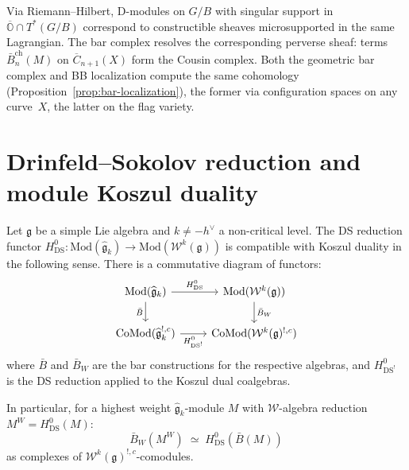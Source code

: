 \begin{remark}
\label{rem:microlocal-viewpoint}
Via Riemann--Hilbert, D-modules on $G/B$ with singular support in $\overline{\mathbb{O}} \cap T^*(G/B)$ correspond to constructible sheaves microsupported in the same Lagrangian.  The bar complex resolves the corresponding perverse sheaf: terms $\bar{B}_n^{\mathrm{ch}}(M)$ on $\overline{C}_{n+1}(X)$ form the Cousin complex.  Both the geometric bar complex and BB localization compute the same cohomology (Proposition~\ref{prop:bar-localization}), the former via configuration spaces on any curve~$X$, the latter on the flag variety.
\end{remark}

\section{Drinfeld--Sokolov reduction and module Koszul duality}
\label{sec:ds-module-kd}

\begin{theorem}
\label{thm:ds-koszul-intertwine}
Let $\mathfrak{g}$ be a simple Lie algebra and $k \neq -h^\vee$
a non-critical level.  The DS reduction functor
$H^0_{\mathrm{DS}}\colon
\mathrm{Mod}(\widehat{\mathfrak{g}}_k) \to
\mathrm{Mod}(\mathcal{W}^k(\mathfrak{g}))$
is compatible with Koszul duality in the following sense.
There is a commutative diagram of functors:
\begin{equation}\label{eq:ds-kd-square}
\begin{tikzcd}
\mathrm{Mod}(\widehat{\mathfrak{g}}_k) \ar[r, "H^0_{\mathrm{DS}}"]
  \ar[d, "\bar{B}"'] &
\mathrm{Mod}(\mathcal{W}^k(\mathfrak{g}))
  \ar[d, "\bar{B}_W"] \\
\mathrm{CoMod}(\widehat{\mathfrak{g}}_k^{!,c})
  \ar[r, "H^0_{\mathrm{DS}^!}"'] &
\mathrm{CoMod}(\mathcal{W}^k(\mathfrak{g})^{!,c})
\end{tikzcd}
\end{equation}
where $\bar{B}$ and $\bar{B}_W$ are the bar constructions for the
respective algebras, and $H^0_{\mathrm{DS}^!}$ is the
DS reduction applied to the Koszul dual coalgebras.

In particular, for a highest weight
$\widehat{\mathfrak{g}}_k$-module $M$ with
$\mathcal{W}$-algebra reduction $M^W = H^0_{\mathrm{DS}}(M)$:
\begin{equation}\label{eq:ds-bar-commute}
\bar{B}_W(M^W)
\;\simeq\;
H^0_{\mathrm{DS}}(\bar{B}(M))
\end{equation}
as complexes of $\mathcal{W}^k(\mathfrak{g})^{!,c}$-comodules.
\end{theorem}

